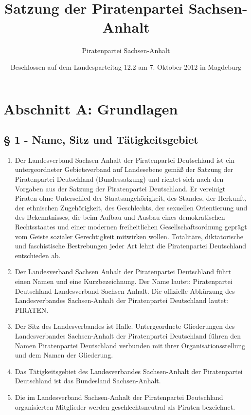 \documentclass[draft,a4paper,10pt]{article}
\title{Satzung der Piratenpartei Sachsen-Anhalt}
\author{Piratenpartei Sachsen-Anhalt}
\date{Beschlossen auf dem Landesparteitag 12.2 am 7. Oktober 2012 in Magdeburg}
\begin{document}
\maketitle
\tableofcontents

\section{Abschnitt A: Grundlagen}

\subsection{§ 1 - Name, Sitz und Tätigkeitsgebiet}
\begin{enumerate}
\item Der Landesverband Sachsen-Anhalt der Piratenpartei Deutschland ist ein
untergeordneter Gebietsverband auf Landesebene gemäß der Satzung der
Piratenpartei Deutschland (Bundessatzung) und richtet sich nach den Vorgaben aus
der Satzung der Piratenpartei Deutschland. Er vereinigt Piraten ohne Unterschied
der Staatsangehörigkeit, des Standes, der Herkunft, der ethnischen
Zugehörigkeit, des Geschlechts, der sexuellen Orientierung und des
Bekenntnisses, die beim Aufbau und Ausbau eines demokratischen Rechtsstaates
und einer modernen freiheitlichen Gesellschaftsordnung geprägt vom Geiste
sozialer Gerechtigkeit mitwirken wollen. Totalitäre, diktatorische und
faschistische Bestrebungen jeder Art lehnt die Piratenpartei Deutschland
entschieden ab.

\item Der Landesverband Sachsen Anhalt der Piratenpartei Deutschland führt einen
Namen und eine Kurzbezeichnung. Der Name lautet: Piratenpartei Deutschland
Landesverband Sachsen-Anhalt. Die offizielle Abkürzung des Landesverbandes
Sachsen-Anhalt der Piratenpartei Deutschland lautet: PIRATEN.

\item Der Sitz des Landesverbandes ist Halle. Untergeordnete Gliederungen des
Landesverbandes Sachsen-Anhalt der Piratenpartei Deutschland führen den Namen
Piratenpartei Deutschland verbunden mit ihrer Organisationsstellung und dem
Namen der Gliederung.

\item Das Tätigkeitsgebiet des Landesverbandes Sachsen-Anhalt der Piratenpartei
Deutschland ist das Bundesland Sachsen-Anhalt.

\item Die im Landesverband Sachsen-Anhalt der Piratenpartei Deutschland
organisierten Mitglieder werden geschlechtsneutral als Piraten bezeichnet.
\end{enumerate}
\end{document}
